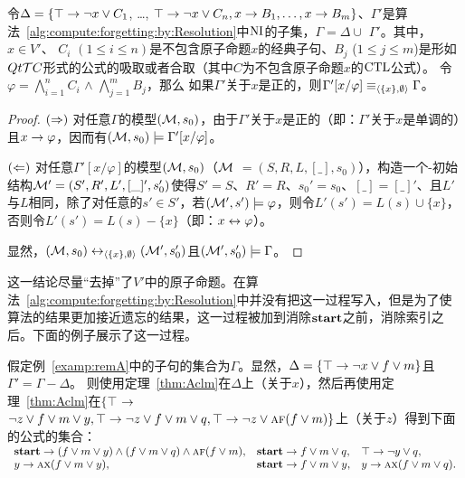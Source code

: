 \begin{theorem}[一般化的Ackermann引理] \label{thm:Aclm}
	令$\Delta = \{\top \rightarrow \neg x \vee C_1$, \dots, $\top \rightarrow \neg x \vee C_n, x \rightarrow B_1, \dots, x \rightarrow B_m\}$、$\Gamma'$是算法~\ref{alg:compute:forgetting:by:Resolution}中$\textrm{NI}$的子集，$\Gamma = \Delta\cup$ $ \Gamma'$。其中，$x\in V'$、
	$C_i$ $(1 \leq i \leq n)$是不包含原子命题$x$的经典子句、$B_j$ ($1 \leq j \leq m$)是形如$Qt {\cal T} C$形式的公式的吸取或者合取（其中$C$为不包含原子命题$x$的$\textrm{CTL}$公式）。
	令$\varphi = \bigwedge_{i=1}^n C_i$ $\wedge$ $\bigwedge_{j=1}^m B_j$，那么
	如果$\Gamma'$关于$x$是正的，则$\Gamma'[x/\varphi] \equiv_{{\langle{\{x\}, \emptyset}\rangle}} \Gamma$。
\end{theorem}
\begin{proof}
	$(\Rightarrow)$ 对任意$\Gamma$的模型$({\cal M}, s_0)$，由于$\Gamma'$关于$x$是正的（即：$\Gamma'$关于$x$是单调的）且$x\rightarrow \varphi$，因而有$({\cal M}, s_0) \models \Gamma'[x/\varphi]$。
	
	$(\Leftarrow)$ 对任意$\Gamma'[x/\varphi]$的模型$({\cal M}, s_0)$（${\cal M}$ $= (S, R, L,[\_], s_0)$），构造一个\Ind-初始结构${\cal M}'=(S', R', L',[\_]', s_0')$使得$S'=S$、$R'=R$、$s_0'= s_0$、$[\_]=[\_]'$、且$L'$与$L$相同，除了对任意的$s'\in S'$，若$({\cal M}', s') \models \varphi$，则令$L'(s') = L(s) \cup \{x\}$，否则令$L'(s') = L(s)-\{x\}$（即：$x \leftrightarrow \varphi$）。
	
	显然，$({\cal M},s_0) \leftrightarrow_{{\langle{\{x\}, \emptyset}\rangle}} ({\cal M}', s_0')$且$({\cal M}',s_0') \models \Gamma$。
\end{proof}

这一结论尽量“去掉”了$V'$中的原子命题。在算法~\ref{alg:compute:forgetting:by:Resolution}中并没有把这一过程写入，但是为了使算法的结果更加接近遗忘的结果，这一过程被加到消除$\textbf{start}$之前，消除索引之后。下面的例子展示了这一过程。
\begin{example}
	假定例~\ref{examp:remA}中的子句的集合为$\Gamma$。显然，$\Delta = \{\top \rightarrow \neg x \vee f \vee m\}$且$\Gamma'=\Gamma-\Delta$。
	则使用定理~\ref{thm:Aclm}在$\Delta$上（关于$x$），然后再使用定理~\ref{thm:Aclm}在$\{\top$ $\rightarrow$ $\neg z \vee f \vee m \vee y, \top \rightarrow \neg z \vee f \vee m\vee q, \top \rightarrow \neg z \vee \textsc{a} \textsc{f} (f \vee m)\}$上（关于$z$）得到下面的公式的集合：\\
	$\begin{array}{lll}
		\textbf{start}\rightarrow (f \vee m \vee y) \wedge (f \vee m\vee q) \wedge \textsc{a} \textsc{f} (f \vee m), &
		\textbf{start} \rightarrow f\vee m \vee q, &
		\top \rightarrow \neg y \vee q, \\
		y \rightarrow \textsc{a} \textsc{x}(f \vee m \vee y), &
		\textbf{start} \rightarrow f \vee m \vee y, & 
		y \rightarrow \textsc{a}\textsc{x}(f \vee m\vee q). 
	\end{array}
	$
\end{example}



